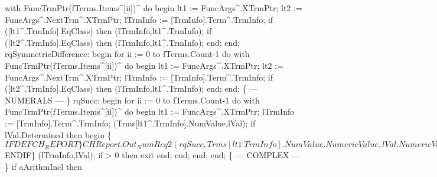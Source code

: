                         with FuncTrmPtr(fTerms.Items^[ii])^ do
                     begin
                        lt1 := FuncArgs^.XTrmPtr; lt2 := FuncArgs^.NextTrm^.XTrmPtr;
                        lTrmInfo := [TrmInfo].Term^.TrmInfo;
                        if ([lt1^.TrmInfo].EqClass) then
                           (lTrmInfo,lt1^.TrmInfo);
                        if ([lt2^.TrmInfo].EqClass) then
                           (lTrmInfo,lt1^.TrmInfo);
                     end;
                  end;
               rqSymmetricDifference:
                  begin
                     for ii := 0 to fTerms.Count-1 do
                        with FuncTrmPtr(fTerms.Items^[ii])^ do
                     begin
                        lt1 := FuncArgs^.XTrmPtr; lt2 := FuncArgs^.NextTrm^.XTrmPtr;
                        lTrmInfo := [TrmInfo].Term^.TrmInfo;
                        if ([lt2^.TrmInfo].EqClass) then
                           (lTrmInfo,lt1^.TrmInfo);
                     end;
                  end;
               \{ --- NUMERALS --- \}
               rqSucc:
                  begin
                     for ii := 0 to fTerms.Count-1 do
                        with FuncTrmPtr(fTerms.Items^[ii])^ do
                     begin
                        lt1 := FuncArgs^.XTrmPtr;
                        lTrmInfo := [TrmInfo].Term^.TrmInfo;
                        (Trms[lt1^.TrmInfo].NumValue,lVal);
                        if lVal.Determined then
                        begin
                           \{$IFDEF CH_REPORT\}
                           CHReport.Out_NumReq2(rqSucc,Trms[lt1^.TrmInfo].NumValue.NumericValue,lVal.NumericValue);
                           \{$ENDIF\}
                           (lTrmInfo,lVal);
                           if  > 0 then exit
                        end;
                     end;
                  end;
            end;
            \{ --- COMPLEX --- \}
            if aArithmIncl then
